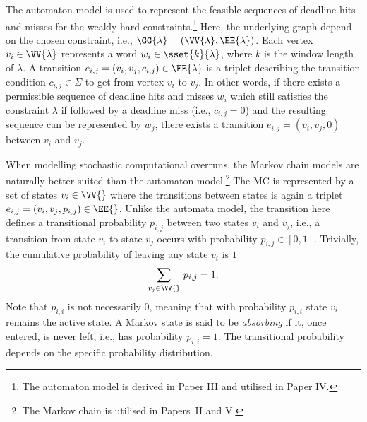 The automaton model is used to represent the feasible sequences of deadline hits and misses for the weakly-hard constraints.\footnote{The automaton model is derived in Paper III and utilised in Paper IV.}
Here, the underlying graph depend on the chosen constraint, i.e., $\GG{\lambda} = (\VV{\lambda}, \EE{\lambda})$.
Each vertex $v_i \in \VV{\lambda}$ represents a word $w_i \in \sset{k}{\lambda}$, where $k$ is the window length of $\lambda$.
A transition $e_{i, j} = (v_i, v_j, c_{i,j}) \in \EE{\lambda}$ is a triplet describing the transition condition $c_{i,j} \in \Sigma$ to get from vertex $v_i$ to $v_j$.
In other words, if there exists a permissible sequence of deadline hits and misses $w_i$ which still satisfies the constraint $\lambda$ if followed by a deadline miss (i.e., $c_{i,j} = 0$) and the resulting sequence can be represented by $w_j$, there exists a transition $e_{i,j} = (v_i, v_j, 0)$ between $v_i$ and $v_j$.

When modelling stochastic computational overruns, the Markov chain models are naturally better-suited than the automaton model.\footnote{The Markov chain is utilised in Papers~II and V.}
The MC is represented by a set of states $v_i \in \VV{}$ where the transitions between states is again a triplet $e_{i, j} = (v_i, v_j, p_{i, j}) \in \EE{}$.
Unlike the automata model, the transition here defines a transitional probability $p_{i, j}$ between two states $v_i$ and $v_j$, i.e., a transition from state $v_i$ to state $v_j$ occurs with probability $p_{i, j} \in [0, 1]$.
Trivially, the cumulative probability of leaving any state $v_i$ is $1$
%
\begin{equation*}
    \sum_{v_j\in\VV{}}\, p_{i, j} = 1.
\end{equation*}
%
Note that $p_{i, i}$ is not necessarily $0$, meaning that with probability $p_{i, i}$ state $v_i$ remains the active state.
A Markov state is said to be \emph{absorbing} if it, once entered, is never left, i.e., has probability $p_{i, i} = 1$.
The transitional probability depends on the specific probability distribution.

